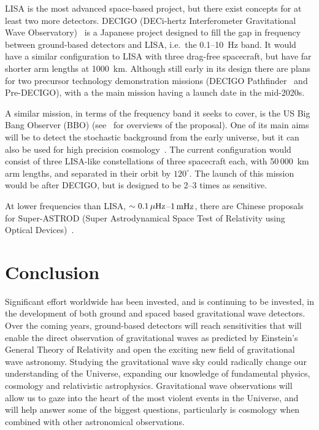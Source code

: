 \documentclass{article}
\begin{document}
LISA is the most advanced space-based project, but there exist concepts for at
least two more detectors. DECIGO (DECi-hertz Interferometer Gravitational Wave
Observatory)~\cite{Sato:2009} is a Japanese project designed to fill the gap in
frequency between ground-based detectors and LISA, i.e.\ the 0.1--10~Hz band. It
would have a similar configuration to LISA with three drag-free spacecraft, but
have far shorter arm lengths at 1000~km. Although still early in its design
there are plans for two precursor technology demonstration missions (DECIGO
Pathfinder~\cite{Ando:2009} and Pre-DECIGO), with a the main mission having a
launch date in the mid-2020s.

A similar mission, in terms of the frequency band it seeks to cover, is the US
Big Bang Observer (BBO) (see~\cite{Crowder:2005, Cutler:2009, Harry:2006} for
overviews of the proposal). One of its main aims will be to detect the
stochastic background from the early universe, but it can also be used for high
precision cosmology~\cite{Cutler:2009}. The current configuration would consist
of three LISA-like constellations of three spacecraft each, with 50\,000~km arm
lengths, and separated in their orbit by $120^{\circ}$. The launch of this
mission would be after DECIGO, but is designed to be 2--3 times as sensitive.

At lower frequencies than LISA, $\sim0.1\,\mu{\rm Hz}$--$1\,{\rm mHz}$, there
are Chinese proposals for Super-ASTROD (Super Astrodynamical Space Test of
Relativity using Optical Devices)~\cite{Ni:2009}.


\newpage

\section{Conclusion}
\label{section:conclusion}

Significant effort worldwide has been invested, and is continuing to be
invested, in the development of both ground and spaced based gravitational wave
detectors. Over the coming years, ground-based detectors will reach
sensitivities that will enable the direct observation of gravitational waves as
predicted by Einstein's General Theory of Relativity and open the exciting new
field of gravitational wave astronomy. Studying the gravitational wave
sky could radically change our understanding of the Universe, expanding our
knowledge of fundamental physics, cosmology and relativistic astrophysics.
Gravitational wave observations will allow us to gaze into the heart of the most
violent events in the Universe, and will help answer some of the biggest
questions, particularly is cosmology when combined with other astronomical
observations.
\end{document}

